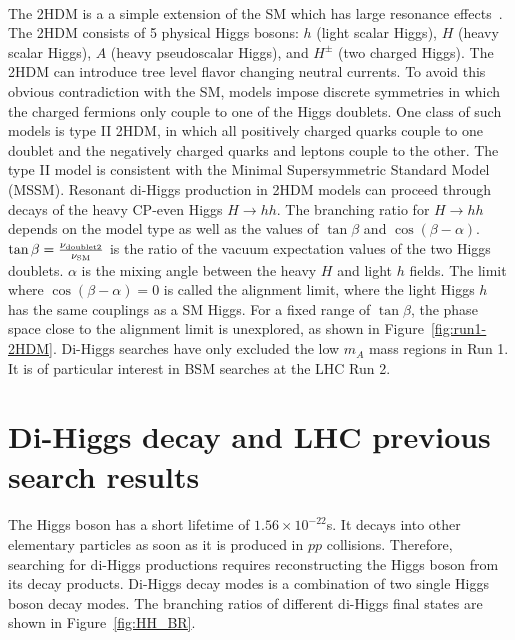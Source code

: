 \paragraph{}
The 2HDM is a a simple extension of the SM which has large resonance effects~\cite{LHCYellow}. 
The 2HDM consists of 5 physical Higgs bosons: $h$ (light scalar Higgs), $H$ (heavy scalar Higgs), $A$ (heavy pseudoscalar Higgs), and $H^{\pm}$ (two charged Higgs). 
The 2HDM can introduce tree level flavor changing neutral currents. 
To avoid this obvious contradiction with the SM, models impose discrete symmetries in which the charged fermions only couple to one of the Higgs doublets.
One class of such models is type II 2HDM, in which all positively charged quarks couple to one doublet and the negatively charged quarks and leptons couple to the other. 
The type II model is consistent with the Minimal Supersymmetric Standard Model (MSSM).
Resonant di-Higgs production in 2HDM models can proceed through decays of the heavy CP-even Higgs $H\to hh$. 
The branching ratio for $H\to hh$ depends on the model type as well as the values of $\tan{\beta}$ and $\cos(\beta - \alpha)$. 
$\tan{\beta} = \frac{\rm \nu_{\rm doublet2}}{\rm \nu_{SM}}$ is the ratio of the vacuum expectation values of the two Higgs doublets. 
$\alpha$ is the mixing angle between the heavy $H$ and light $h$ fields. 
The limit where $\cos(\beta - \alpha) = 0$ is called the alignment limit, where the light Higgs $h$ has the same couplings as a SM Higgs.
For a fixed range of $\tan{\beta}$, the phase space close to the alignment limit is unexplored, as shown in Figure~\ref{fig:run1-2HDM}.
Di-Higgs searches have only excluded the low $m_A$ mass regions in Run 1.
It is of particular interest in BSM searches at the LHC Run 2.


\section{Di-Higgs decay and LHC previous search results}
\label{sec:hhdecay}
\paragraph{}
The Higgs boson has a short lifetime of $1.56 \times 10^{-22}$s.
It decays into other elementary particles as soon as it is produced in $pp$ collisions. 
Therefore, searching for di-Higgs productions requires reconstructing the Higgs boson from its decay products.
Di-Higgs decay modes is a combination of two single Higgs boson decay modes. 
The branching ratios of different di-Higgs final states are shown in Figure~\ref{fig:HH_BR}.

